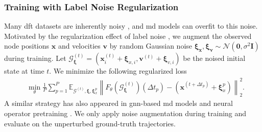 \subsubsection{Training with Label Noise Regularization}
\label{sec:label_noise}
Many \gls{dft} datasets are inherently noisy \cite{christensen_role_2020}, and \gls{md} models can overfit to this noise. Motivated by the regularization effect of label noise \cite{damian_label_2021,haochen_shape_2020}, we augment the observed node  positions \(\mathbf{x}\) and velocities \(\mathbf{v}\) by random Gaussian noise \(\boldsymbol{\xi}_\mathbf{x}, \boldsymbol{\xi}_\mathbf{v} \sim \mathcal{N}(\mathbf{0}, \sigma^2 \mathbf{I})\) during training. 
Let ${\mathcal{G}}^{(t)}_{\boldsymbol{\xi}} = ( \mathbf x_i^{(t)} + \boldsymbol{\xi}_{x, i}, \mathbf v^{(t)} + \boldsymbol{\xi}_{v,i})$ be the noised initial state at time $t$. We minimize the following regularized loss
\begin{align*}
    &\min_{\theta} \frac{1}{P} \sum_{p=1}^P \mathbb{E}_{ 
            \mathcal{G}^{(t)}, \boldsymbol{\xi}, \boldsymbol{\xi}_x^p} 
         \left\|
            F_\theta\left( \mathcal{G}^{(t)}_{\boldsymbol{\xi}}   \right)(\Delta t_p) - (\mathbf{x}^{(t+ \Delta t_p) } + \boldsymbol{\xi}_x^p)
        \right\|_{2}^{2}.
\end{align*}
A similar strategy has also appeared in \gls{gnn}-based  \gls{md} models and neural operator pretraining \cite{dauparas_robust_2022, zhou_strategies_2024, hao_dpot_2024}. 
We only apply noise augmentation during training and evaluate on the unperturbed ground-truth trajectories.


